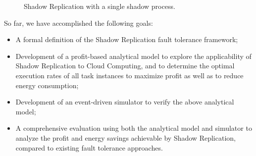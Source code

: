 \begin{figure}[!t]
	\begin{center}
	\end{center}
	\caption{Shadow Replication with a single shadow process.}
	\label{fig:sc_overview}
\end{figure}


So far, we have accomplished the following goals:
\begin{itemize}
	\item A formal definition of the Shadow Replication fault tolerance framework;

	\item Development of a profit-based analytical model to explore the applicability of
	  Shadow Replication to Cloud Computing, and to determine the optimal
	  execution rates of all task instances to maximize profit as well as to reduce energy consumption;

	\item Development of an event-driven simulator to verify the above analytical model;

	\item A comprehensive evaluation using both the analytical model and simulator to analyze the profit and 
	energy savings achievable by Shadow Replication, compared to existing fault tolerance approaches.
\end{itemize}

